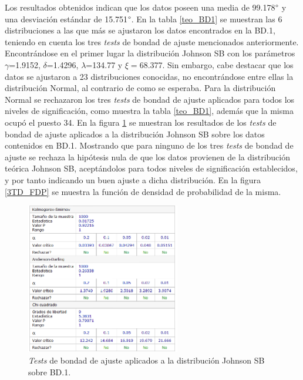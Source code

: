 \documentclass[12pt]{report}
\begin{document}
	 Los resultados obtenidos indican que los datos poseen una media de 99.178$\degree$ y una desviación estándar de 15.751$\degree$.
	 En la tabla \ref{teo_BD1}  se muestran las 6 distribuciones a las que más se ajustaron los datos encontrados en la BD.1, teniendo en cuenta los tres \textit{tests} de bondad de ajuste mencionados anteriormente. Encontrándose en el primer lugar la distribución Johnson SB con los parámetros $\gamma$=1.9152, $\delta$=1.4296, $\lambda$=134.77 y $\xi=$68.377. Sin embargo, cabe destacar que los datos se ajustaron a 23 distribuciones conocidas, no encontrándose entre ellas la distribución Normal, al contrario de como se esperaba. Para la distribución Normal se rechazaron los tres \textit{tests} de bondad de ajuste aplicados para todos los niveles de significación, como muestra la tabla \ref{teo_BD1}, además que la misma ocupó el puesto 34. En la figura \ref{3TD_BONDAD} se  muestran los resultados de los \textit{tests} de bondad de ajuste aplicados a la distribución Johnson SB sobre los datos contenidos en BD.1. Mostrando que para ninguno de los tres \textit{tests} de bondad de ajuste  se rechaza la hipótesis nula de que los datos provienen de la distribución teórica Johnson SB, aceptándolos para todos niveles de significación establecidos, y por tanto indicando un buen ajuste a dicha distribución. En la figura \ref{3TD_FDP}  se muestra la función de densidad de probabilidad de la misma.
	  	\begin{figure}[htbp]
	  	\centering
	  	
 	  	\includegraphics[width=0.6\textwidth]{3td_BONDAD.png}
	  	\caption{\textit{Tests} de bondad de ajuste aplicados a la distribución Johnson SB sobre BD.1.}
	  	\label{3TD_BONDAD}
	  \end{figure}
	  
\end{document}
